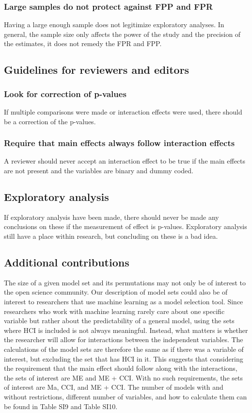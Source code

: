 \subsubsection{Large samples do not protect against FPP and FPR}
Having a large enough sample does not legitimize exploratory analyses. In general, the sample size only affects the power of the study and the precision of the estimates, it does not remedy the FPR and FPP. 

\subsection{Guidelines for reviewers and editors}

\subsubsection{Look for correction of p-values}
If multiple comparisons were made or interaction effects were used, there should be a correction of the p-values.
\subsubsection{Require that main effects always follow interaction effects}
A reviewer should never accept an interaction effect to be true if the main effects are not present and the variables are binary and dummy coded. 
\subsection{Exploratory analysis}
If exploratory analysis have been made, there should never be made any conclusions on these if the measurement of effect is p-values. Exploratory analysis still have a place within research, but concluding on these is a bad idea.  

\subsection{Additional contributions}
The size of a given model set and its permutations may not only be of interest to the open science community. Our description of model sets could also be of interest to researchers that use machine learning as a model selection tool. Since researchers who work with machine learning rarely care about one specific variable but rather about the predictability of a general model, using the sets where HCI is included is not always meaningful. Instead, what matters is whether the researcher will allow for interactions between the independent variables. The calculations of the model sets are therefore the same as if there was a variable of interest, but excluding the set that has HCI in it. This suggests that considering the requirement that the main effect should follow along with the interactions, the sets of interest are ME and ME + CCI. With no such requirements, the sets of interest are Ma, CCI, and ME + CCI. The number of models with and without restrictions, different number of variables, and how to calculate them can be found in Table SI9 and Table SI10. 


 
